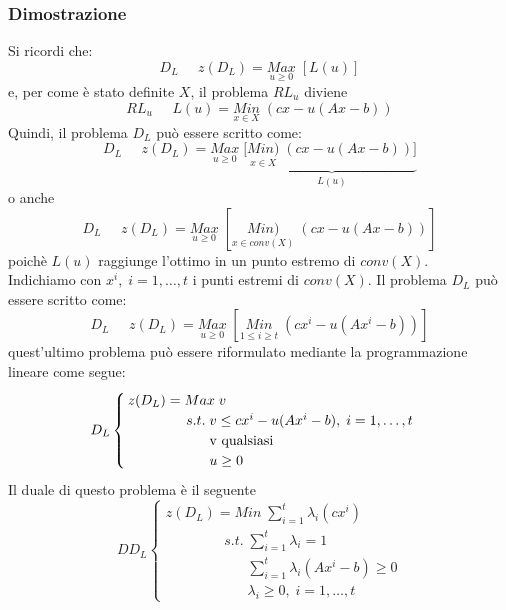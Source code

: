 \subsubsection{Dimostrazione}
Si ricordi che:
\begin{equation*}
	D_{L}\;\;\;\;\;z(D_{L})=\underset{u\ge 0}{Max}\;[L(u)]
\end{equation*}
e, per come è stato definite $X$, il problema $RL_{u}$ diviene
\begin{equation*}
	RL_{u}\;\;\;\;\;L(u)=\underset{x\in X}{Min}\;(cx-u(Ax-b))
\end{equation*}
Quindi, il problema $D_{L}$ può essere scritto come:
\begin{equation*}
	D_{L}\;\;\;\;\;z(D_{L})=\underset{u\ge 0}{Max}\;[\underbrace{\underset{x\in X}{Min)}\;(cx-u(Ax-b))]}_{L(u)}
\end{equation*}
o anche
\begin{equation*}
D_{L}\;\;\;\;\;z(D_{L})=\underset{u\ge 0}{Max}\;[\underset{x\in conv(X)}{Min)}\;(cx-u(Ax-b))]
\end{equation*}
poichè $L(u)$ raggiunge l'ottimo in un punto estremo di $conv(X)$.\\
Indichiamo con $x^{i},\;i=1,\dots,t$ i punti estremi di $conv(X)$. Il problema $D_{L}$ può essere scritto come:
\begin{equation*}
	D_{L}\;\;\;\;\;z(D_{L})=\underset{u\ge 0}{Max}\;[\underset{1\le i\ge t}{Min}\;(cx^{i}-u(Ax^{i}-b))]
\end{equation*}
quest'ultimo problema può essere riformulato mediante la programmazione lineare come segue:
\begin{equation*}
	D_{L}
	\begin{cases}
	z(D_{L})=Max\; v \\
	\;\;\;\;\;\;\;\;\;\;\;\;\;\;\;s.t.\; v\le cx^{i}-u(Ax^{i}-b),\;i=1,\dots,t\\
	\;\;\;\;\;\;\;\;\;\;\;\;\;\;\;\;\;\;\;\;\;\textnormal{v qualsiasi} \\
	\;\;\;\;\;\;\;\;\;\;\;\;\;\;\;\;\;\;\;\;\;u\ge 0
	\end{cases}
\end{equation*}
Il duale di questo problema è il seguente
\begin{equation*}
	DD_{L}
	\begin{cases}
		z(D_{L})=Min\;\sum_{i=1}^{t}\lambda_{i}(cx^{i})\\
		\;\;\;\;\;\;\;\;\;\;\;\;\;\;\;s.t.\; \sum_{i=1}^{t}\lambda_{i}=1 \\
		\;\;\;\;\;\;\;\;\;\;\;\;\;\;\;\;\;\;\;\;\;\sum_{i=1}^{t}\lambda_{i}(Ax^{i}-b)\ge 0 \\
		\;\;\;\;\;\;\;\;\;\;\;\;\;\;\;\;\;\;\;\;\;\lambda_{i}\ge 0,\;i=1,\dots,t
	\end{cases}
\end{equation*}
